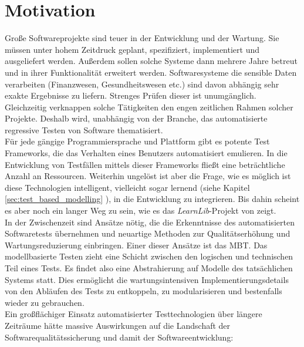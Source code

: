 \section{Motivation}
Große Softwareprojekte sind teuer in der Entwicklung und der Wartung. Sie müssen unter hohem Zeitdruck geplant, spezifiziert, implementiert und ausgeliefert werden. Außerdem sollen solche Systeme dann mehrere Jahre betreut und in ihrer Funktionalität erweitert werden. Softwaresysteme die sensible Daten verarbeiten (Finanzwesen, Gesundheitswesen etc.) sind davon abhängig sehr exakte Ergebnisse zu liefern. Strenges Prüfen dieser ist unumgänglich. Gleichzeitig verknappen solche Tätigkeiten den engen zeitlichen Rahmen solcher Projekte. Deshalb wird, unabhängig von der Branche, das automatisierte regressive Testen von Software thematisiert\cite{graham_experiences_2012}.\\
Für jede gängige Programmiersprache und Plattform gibt es potente Test \Glspl{Framework}, die das Verhalten eines Benutzers automatisiert emulieren. In die Entwicklung von Testfällen mittels dieser \Glspl{Framework} fließt eine beträchtliche Anzahl an Ressourcen. Weiterhin ungelöst ist aber die Frage, wie es möglich ist diese Technologien intelligent, vielleicht sogar lernend (siehe Kapitel \ref{sec:test_based_modelling} ), in die Entwicklung zu integrieren. Bis dahin scheint es aber noch ein langer Weg zu sein, wie es das \textit{LearnLib}-Projekt von \citeauthor{steffen_introduction_2011} zeigt\cite{steffen_introduction_2011}.\\
In der Zwischenzeit sind Ansätze nötig, die die Erkenntnisse des automatisierten Softwaretests übernehmen und neuartige Methoden zur Qualitätserhöhung und Wartungsreduzierung einbringen. Einer dieser Ansätze ist das \Gls{MBT}. Das modellbasierte Testen zieht eine Schicht zwischen den logischen und technischen Teil eines Tests. Es findet also eine Abstrahierung auf Modelle des tatsächlichen Systems statt. Dies ermöglicht die wartungsintensiven Implementierungsdetails von den Abläufen des Tests zu entkoppeln, zu modularisieren und bestenfalls wieder zu gebrauchen.\\
Ein großflächiger Einsatz automatisierter Testtechnologien über längere Zeiträume hätte massive Auswirkungen auf die Landschaft der Softwarequalitätssicherung und damit der Softwareentwicklung:

